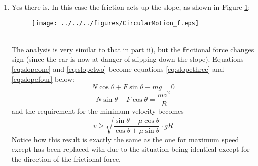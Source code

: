\begin{problem}
{\begin{enumerate}
\begin{enumerate}
\begin{equation} \label{eq:slopeone} N\cos\theta-F\sin\theta-mg=0 \end{equation}
and
\begin{equation} \label{eq:slopetwo} N\sin\theta+F\cos\theta=\frac{mv^2}{R} \end{equation}
Substituting \value{F}{\mu N}{} in equation \eqref{eq:slopeone} gives
\begin{align*}
N\cos\theta-\mu N\sin\theta&=mg \\
\Rightarrow \frac{N\cos\theta-\mu N\sin\theta}{g}&=m
\end{align*}
then substituting in \value{F}{\mu N} and for  (using the expression above) in equation \eqref{eq:slopetwo} we find
\begin{equation*} N\sin\theta+\mu N\cos\theta=\frac{\left(N\cos\theta-\mu N\sin\theta\right)v^2}{gR} \end{equation*} 
\begin{equation*} \Rightarrow v^2=\frac{\sin\theta+\mu \cos\theta}{\cos\theta-\mu \sin\theta}\cdot gR \end{equation*}
So now in order not to slip up the slope
\begin{equation*} v\le\sqrt{\frac{\sin\theta+\mu \cos\theta}{\cos\theta-\mu \sin\theta}\cdot gR} \end{equation*}
Notice how in the case \value{\theta}{0}{^\circ} this expression simplifies to the answer from part a), and similarly if \value{\mu}{0}{} the answer from part b) i).
\\
\item Yes there is. In this case the friction acts up the slope, as shown in Figure \ref{fig:CircularMotion_f}:
\begin{figure}[ht]
\centering
\texttt{[image: ../../../figures/CircularMotion\_f.eps]}
\caption{}
\label{fig:CircularMotion_f}
\end{figure}
\\
The analysis is very similar to that in part ii), but the frictional force changes sign (since the car is now at danger of slipping down the slope). Equations \eqref{eq:slopeone} and \eqref{eq:slopetwo} become equations \eqref{eq:slopethree} and \eqref{eq:slopefour} below:
\begin{equation}
 N\cos\theta+F\sin\theta-mg=0
\label{eq:slopethree}
\end{equation}
\begin{equation} 
N\sin\theta-F\cos\theta=\frac{mv^2}{R}
\label{eq:slopefour}
\end{equation}
and the requirement for the minimum velocity becomes
\begin{equation*}
v\ge\sqrt{\frac{\sin\theta-\mu \cos\theta}{\cos\theta+\mu \sin\theta}\cdot gR}
\end{equation*}
Notice how this result is exactly the same as the one for maximum speed except \vari{\mu} has been replaced with \vari{-\mu} due to the situation being identical except for the direction of the frictional force. 
\end{enumerate}
\end{enumerate}
}
\end{problem}